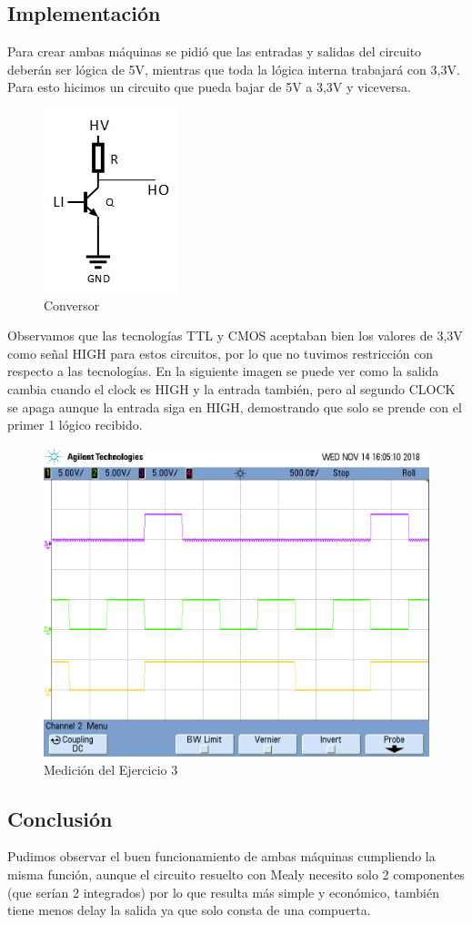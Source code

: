 \documentclass[10pt,a4paper]{article}
\begin{document}
\subsection{Implementación}
Para crear ambas máquinas se pidió que las entradas y salidas del circuito deberán ser lógica de 5V, mientras que toda la lógica interna trabajará con 3,3V. Para esto hicimos un circuito que pueda bajar de 5V a 3,3V y viceversa.

\begin{figure}[H]
	\centering
	\includegraphics[scale=1]{Imagenes/Conversor.jpg}
	\caption{Conversor}
\end{figure}

Observamos que las tecnologías TTL y CMOS aceptaban bien los valores de 3,3V como señal HIGH para estos circuitos, por lo que no tuvimos restricción con respecto a las tecnologías.
En la siguiente imagen se puede ver como la salida cambia cuando el clock es HIGH y la entrada también, pero al segundo CLOCK se apaga aunque la entrada siga en HIGH, demostrando que solo se prende con el primer 1 lógico recibido.
\begin{figure}[H]
	\centering
	\includegraphics[width=14cm]{Imagenes/MedicionTP3_Ej3.png}
	\caption{Medición del Ejercicio 3}
\end{figure}

\subsection{Conclusión}
Pudimos observar el buen funcionamiento de ambas máquinas cumpliendo la misma función, aunque el circuito resuelto con Mealy necesito solo 2 componentes (que serían 2 integrados) por lo que resulta más simple y económico, también tiene menos delay la salida ya que solo consta de una compuerta.
\end{document}
